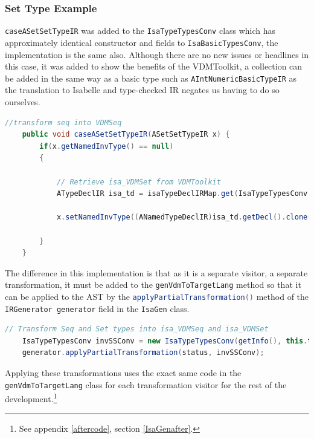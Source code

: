     \subsubsection{Set Type Example}
    \lstinline[language=Java]{caseASetSetTypeIR} was added to the \lstinline[language=Java]{IsaTypeTypesConv} class which has approximately identical constructor and fields to \lstinline[language=Java]{IsaBasicTypesConv}, the implementation is the same also. Although there are no new issues or headlines in this case, it was added to show the benefits of the VDMToolkit, a collection can be added in the same way as a basic type such as \lstinline[language=Java]{AIntNumericBasicTypeIR} as the translation to Isabelle and type-checked IR negates us having to do so ourselves.
    \begin{lstlisting}[language=Java]
    //transform seq into VDMSeq
    public void caseASetSetTypeIR(ASetSetTypeIR x) {
    	if(x.getNamedInvType() == null)
        {
            
            // Retrieve isa_VDMSet from VDMToolkit
            ATypeDeclIR isa_td = isaTypeDeclIRMap.get(IsaTypeTypesConv.isa_VDMSet);

            x.setNamedInvType((ANamedTypeDeclIR)isa_td.getDecl().clone());
            
        }
    }
    \end{lstlisting} 
	The difference in this implementation is that as it is a separate visitor, a separate transformation, it must be added to the \lstinline[language=Java]{genVdmToTargetLang} method so that it can be applied to the AST by the \lstinline[language=Java]{applyPartialTransformation()} method of the \lstinline[language=Java]{IRGenerator generator} field in the \lstinline[language=Java]{IsaGen} class.
	\begin{lstlisting}[language=Java]
	// Transform Seq and Set types into isa_VDMSeq and isa_VDMSet
    IsaTypeTypesConv invSSConv = new IsaTypeTypesConv(getInfo(), this.transAssistant, vdmToolkitModuleIR);
    generator.applyPartialTransformation(status, invSSConv);
	\end{lstlisting}
	Applying these transformations uses the exact same code in the \lstinline[language=Java]{genVdmToTargetLang} class for each transformation visitor for the rest of the development.\footnote{See appendix \ref{aftercode}, section \ref{IsaGenafter}.}

